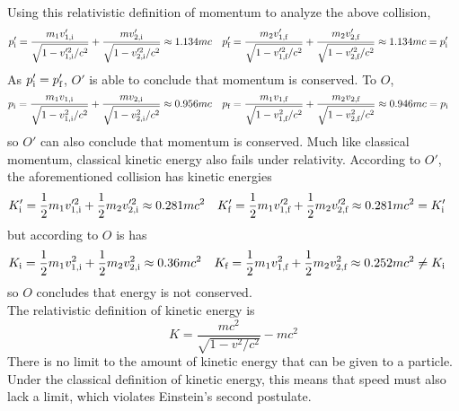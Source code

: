 \documentclass{subfiles}
\begin{document}
			Using this relativistic definition of momentum to analyze the above collision,
			\begin{align*}
				p_{\text{i}}' &= \frac{m_1v_{\text{1,i}}'}{\sqrt{1 - v_{\text{1,i}}'^2/c^2}} + \frac{mv_{\text{2,i}}'}{\sqrt{1 - v_{\text{2,i}}'^2/c^2}}
						\approx 1.134mc &
					p_{\text{f}}' &= \frac{m_2v_{\text{1,f}}'}{\sqrt{1 - v_{\text{1,f}}'^2/c^2}} + \frac{m_2v_{\text{2,f}}'}{\sqrt{1 - v_{\text{2,f}}'^2/c^2}}
						\approx 1.134mc
						= p_{\text{i}}'
			\end{align*}
			As \(p_{\text{i}}' = p_{\text{f}}'\), \(O'\) is able to conclude that momentum is conserved. To \(O\),
			\begin{align*}
				p_{\text{i}} &= \frac{m_1v_{\text{1,i}}}{\sqrt{1 - v_{\text{1,i}}^2/c^2}} + \frac{mv_{\text{2,i}}}{\sqrt{1 - v_{\text{2,i}}^2/c^2}}
						\approx 0.956mc &
					p_{\text{f}} &= \frac{m_1v_{\text{1,f}}}{\sqrt{1 - v_{\text{1,f}}^2/c^2}} + \frac{m_2v_{\text{2,f}}}{\sqrt{1 - v_{\text{2,f}}^2/c^2}}
						\approx 0.946mc
						= p_{\text{i}}
			\end{align*}
			so \(O'\) can also conclude that momentum is conserved.
			Much like classical momentum, classical kinetic energy also fails under relativity. According to \(O'\), the aforementioned collision has kinetic energies
				\begin{align*}
					K_{\text{i}}' &= \frac{1}{2}m_1v_{\text{1,i}}'^2 + \frac{1}{2}m_2v_{\text{2,i}}'^2 
						\approx 0.281mc^2 &
						K_{\text{f}}' &= \frac{1}{2}m_1v_{\text{1,f}}'^2 + \frac{1}{2}m_2v_{\text{2,f}}'^2 
							\approx 0.281mc^2
							= K_{\text{i}}'
				\end{align*}
				but according to \(O\) is has
				\begin{align*}
					K_{\text{i}} &= \frac{1}{2}m_1v_{\text{1,i}}^2 + \frac{1}{2}m_2v_{\text{2,i}}^2 
						\approx 0.36mc^2 &
						K_{\text{f}} &= \frac{1}{2}m_1v_{\text{1,f}}^2 + \frac{1}{2}m_2v_{\text{2,f}}^2 
							\approx 0.252mc^2
							\ne K_{\text{i}}
				\end{align*}
				so \(O\) concludes that energy is not conserved. \\
			The relativistic definition of kinetic energy is
				\[K = \frac{mc^2}{\sqrt{1 - v^2/c^2}} - mc^2 \tag{relativistic kinetic energy}\]
			There is no limit to the amount of kinetic energy that can be given to a particle. Under the classical definition of kinetic energy, this means that speed must also lack a limit, which violates Einstein's second postulate.
\end{document}

